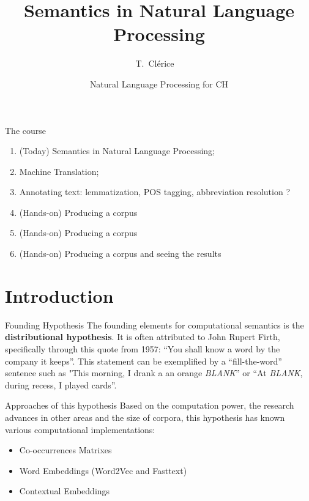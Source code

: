 \documentclass[aspectratio=169]{beamer}
\title[NLP 4 CH] %
{Semantics in Natural Language Processing}
\author[Clérice, Thibault] %
{T.~Clérice~\inst{1}~\inst{2}}
\institute[Inria] %
{
  \inst{1}%
  ALMAnaCH, Inria, Paris, France \and
  \inst{2}%
  FeDHLab, Università Federico II, Napoli, Italia
 }
\date[2024] %
{Natural Language Processing for CH}
\begin{document}
\frame{\titlepage}

\begin{frame}{The course}
    \begin{enumerate}
        \item (Today) Semantics in Natural Language Processing;
        \item Machine Translation;
        \item Annotating text: lemmatization, POS tagging, abbreviation resolution ?
        \item (Hands-on) Producing a corpus
        \item (Hands-on) Producing a corpus
        \item (Hands-on) Producing a corpus and seeing the results
    \end{enumerate}
\end{frame}

\section{Introduction}

\begin{frame}{Founding Hypothesis}
    The founding elements for computational semantics is the \textbf{distributional hypothesis}. It is often attributed to John Rupert Firth, specifically through this quote from 1957: ``You shall know a word by the company it keeps''.
    \vspace{1em}
    This statement can be exemplified by a ``fill-the-word'' sentence such as "This morning, I drank a an orange \textit{BLANK}'' or ``At \textit{BLANK}, during recess, I played cards''.
\end{frame}

\begin{frame}{Approaches of this hypothesis}
    Based on the computation power, the research advances in other areas and the size of corpora, this hypothesis has known various computational implementations:
    \begin{itemize}
        \item Co-occurrences Matrixes
        \item Word Embeddings (Word2Vec and Fasttext)
        \item Contextual Embeddings
    \end{itemize}
\end{frame}
\end{document}

